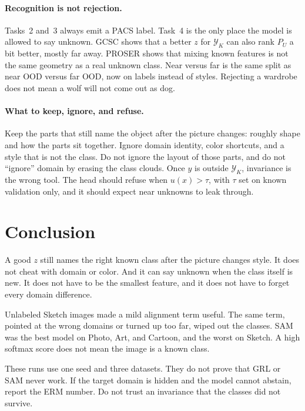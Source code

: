\documentclass{article}
\begin{document}
\paragraph{Recognition is not rejection.}
Tasks~2 and~3 always emit a PACS label.
Task~4 is the only place the model is allowed to say unknown.
GCSC shows that a better $z$ for $\mathcal{Y}_K$ can also rank $P_U$ a bit better, mostly far away.
PROSER shows that mixing known features is not the same geometry as a real unknown class.
Near versus far is the same split as near OOD versus far OOD, now on labels instead of styles.
Rejecting a wardrobe does not mean a wolf will not come out as dog.

\paragraph{What to keep, ignore, and refuse.}
Keep the parts that still name the object after the picture changes: roughly shape and how the parts sit together.
Ignore domain identity, color shortcuts, and a style that is not the class.
Do not ignore the layout of those parts, and do not ``ignore'' domain by erasing the class clouds.
Once $y$ is outside $\mathcal{Y}_K$, invariance is the wrong tool.
The head should refuse when $u(x)>\tau$, with $\tau$ set on known validation only, and it should expect near unknowns to leak through.

\section{Conclusion}
\label{sec:conclusion}

A good $z$ still names the right known class after the picture changes style.
It does not cheat with domain or color.
And it can say unknown when the class itself is new.
It does not have to be the smallest feature, and it does not have to forget every domain difference.

Unlabeled Sketch images made a mild alignment term useful.
The same term, pointed at the wrong domains or turned up too far, wiped out the classes.
SAM was the best model on Photo, Art, and Cartoon, and the worst on Sketch.
A high softmax score does not mean the image is a known class.

These runs use one seed and three datasets.
They do not prove that GRL or SAM never work.
If the target domain is hidden and the model cannot abstain, report the ERM number.
Do not trust an invariance that the classes did not survive.

\clearpage


\end{document}
